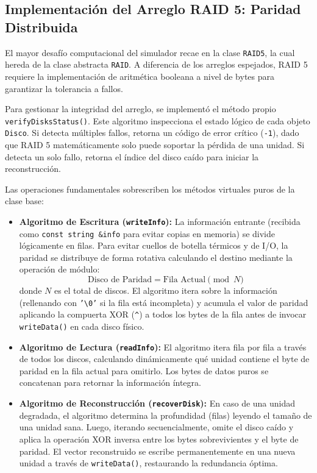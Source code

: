 \documentclass[12pt, a4paper]{article}
\begin{document}
\subsection{Implementación del Arreglo RAID 5: Paridad Distribuida}
El mayor desafío computacional del simulador recae en la clase \texttt{RAID5}, la cual hereda de la clase abstracta \texttt{RAID}. A diferencia de los arreglos espejados, RAID 5 requiere la implementación de aritmética booleana a nivel de bytes para garantizar la tolerancia a fallos.

Para gestionar la integridad del arreglo, se implementó el método propio \texttt{verifyDisksStatus()}. Este algoritmo inspecciona el estado lógico de cada objeto \texttt{Disco}. Si detecta múltiples fallos, retorna un código de error crítico (\texttt{-1}), dado que RAID 5 matemáticamente solo puede soportar la pérdida de una unidad. Si detecta un solo fallo, retorna el índice del disco caído para iniciar la reconstrucción.

Las operaciones fundamentales sobrescriben los métodos virtuales puros de la clase base:

\begin{itemize}
    \item \textbf{Algoritmo de Escritura (\texttt{writeInfo}):} 
    La información entrante (recibida como \texttt{const string \&info} para evitar copias en memoria) se divide lógicamente en filas. Para evitar cuellos de botella térmicos y de I/O, la paridad se distribuye de forma rotativa calculando el destino mediante la operación de módulo:
    \begin{equation}
        \text{Disco de Paridad} = \text{Fila Actual} \pmod N
    \end{equation}
    donde $N$ es el total de discos. El algoritmo itera sobre la información (rellenando con \texttt{'\textbackslash0'} si la fila está incompleta) y acumula el valor de paridad aplicando la compuerta XOR (\texttt{\^{}}) a todos los bytes de la fila antes de invocar \texttt{writeData()} en cada disco físico.

    \item \textbf{Algoritmo de Lectura (\texttt{readInfo}):} 
    El algoritmo itera fila por fila a través de todos los discos, calculando dinámicamente qué unidad contiene el byte de paridad en la fila actual para omitirlo. Los bytes de datos puros se concatenan para retornar la información íntegra.

    \item \textbf{Algoritmo de Reconstrucción (\texttt{recoverDisk}):} 
    En caso de una unidad degradada, el algoritmo determina la profundidad (filas) leyendo el tamaño de una unidad sana. Luego, iterando secuencialmente, omite el disco caído y aplica la operación XOR inversa entre los bytes sobrevivientes y el byte de paridad. El vector reconstruido se escribe permanentemente en una nueva unidad a través de \texttt{writeData()}, restaurando la redundancia óptima.
\end{itemize}
\end{document}
